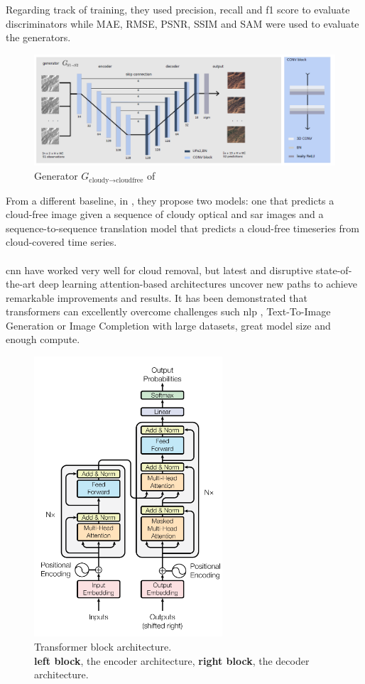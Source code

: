 \documentclass[11pt, a4paper]{article}
\begin{document}
	\\\\
	Regarding track of training, they used precision, recall and f1 score to evaluate discriminators while MAE, RMSE, PSNR, SSIM and SAM were used to evaluate the generators.
	\begin{figure}[H]
		\centering
		\includegraphics[width=13cm]{imgs/relatedwork/sen12mscr-ts-gen-model}
		\caption{Generator $G_{\text{cloudy} \rightarrow \text{cloudfree}}$ of \cite{sen12mscrts}}
		\label{fig:sen12mscrts-gen}
	\end{figure}
	From a different baseline, in \cite{sen12mscrts}, they propose two models: one that predicts a cloud-free image given a sequence of cloudy optical and \gls{sar} images and a sequence-to-sequence translation model that predicts a cloud-free timeseries from cloud-covered time series.
	\\\\
	\gls{cnn} have worked very well for cloud removal, but latest and disruptive state-of-the-art deep learning attention-based architectures \cite{VaswaniSPUJGKP17} uncover new paths to achieve remarkable improvements and results. It has been demonstrated that transformers can excellently overcome challenges such \gls{nlp} \cite{brown2020language}, Text-To-Image Generation \cite{pmlr-v139-ramesh21a}  or Image Completion \cite{pmlr-v119-chen20s} with large datasets, great model size and enough compute.
	\begin{figure}[H]
		\centering
		\includegraphics[width=7cm]{imgs/relatedwork/transformer-block}
		\caption{Transformer block architecture. \\
			\textbf{left block}, the encoder architecture, \textbf{right block}, the decoder architecture.}
		\label{fig:related-transformer-block}
	\end{figure}
\end{document}
